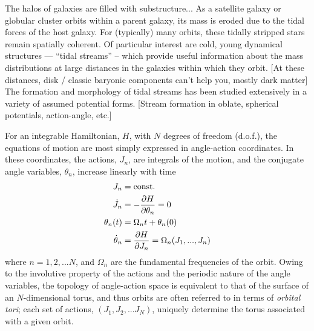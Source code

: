 \documentclass[letterpaper,12pt,preprint]{aastex}
\newcommand{\act}{J}
\begin{document}
The halos of galaxies are filled with substructure...
As a satellite galaxy or globular cluster orbits within a parent galaxy, its mass is eroded due to the tidal forces of the host galaxy. For (typically) many orbits, these tidally stripped stars remain spatially coherent.
Of particular interest are cold, young dynamical structures --- ``tidal streams'' -- which provide useful information about the mass distributions at large distances in the galaxies within which they orbit. [At these distances, disk / classic baryonic components can't help you, mostly dark matter]
The formation and morphology of tidal streams has been studied extensively in a variety of assumed potential forms. [Stream formation in oblate, spherical potentials, action-angle, etc.]

For an integrable Hamiltonian, $H$, with $N$ degrees of freedom (d.o.f.), the equations of motion are most simply expressed in angle-action coordinates. In these coordinates, the actions, $J_n$, are integrals of the motion, and the conjugate angle variables, $\theta_n$, increase linearly with time
\begin{align}
	\act_n &= {\rm const.}\\
	\dot{\act}_n &= -\frac{\partial H}{\partial \theta_n} = 0\\
	\theta_n(t) &= \Omega_n t + \theta_n(0)\\
	\dot{\theta}_n &= \frac{\partial H}{\partial \act_n} = \Omega_n(\act_1,...,\act_n)\label{eq:aafreq}
\end{align}
where $n=1,2,...N$, and $\Omega_n$ are the fundamental frequencies of the orbit. Owing to the involutive property of the actions and the periodic nature of the angle variables, the topology of angle-action space is equivalent to that of the surface of an $N$-dimensional torus, and thus orbits are often referred to in terms of \emph{orbital tori}; each set of actions, $(\act_1,\act_2,...\act_N)$, uniquely determine the torus associated with a given orbit.
\end{document}
